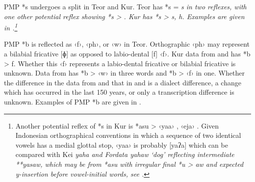 PMP *s undergoes a split in Teor and Kur.
Teor has *s = \it{s} in two reflexes,
with one other potential reflex showing *s > {\0}.
Kur has *s > \it{s, h}.
Examples are given in .\footnote{
		Another potential
		reflex of *s in Kur is *asu > ‹yaa› \citep[33]{Rado2021},
		‹eja› \citep{vonRosenberg1867}.
		Given Indonesian orthographical conventions in which a sequence
		of two identical vowels has a medial glottal stop,
		‹yaa› is probably [yaʔa] which can be compared with Kei
		\it{yaha} and Fordata \it{yahaw} ‘dog’ reflecting intermediate **yasaw,
		which may be from *asu with irregular final *u > \it{aw}
		and expected \it{y-}insertion before vowel-initial words,
		see .} 


\largerpage
PMP *b is reflected as ‹f›,
‹ph›, or ‹w› in Teor.
Orthographic ‹ph› may represent a bilabial fricative [ɸ]
as opposed to labio-dental [f] ‹f›.
Kur data from \citet{Ohoiwutun2021}
and \citet{Rado2021} has *b > f.
Whether this ‹f› represents a labio-dental fricative or
bilabial fricative is unknown.
Data from \citet{vonRosenberg1867} has *b > ‹w› in three
words and *b > ‹f› in one.
Whether the difference in the data from \citet{vonRosenberg1867}
and that in \citet{Ohoiwutun2021}
and \citet{Rado2021} is a dialect difference, a change which
has occurred in the last 150 years, or only a transcription difference is unknown.
Examples of PMP *b are given in .

